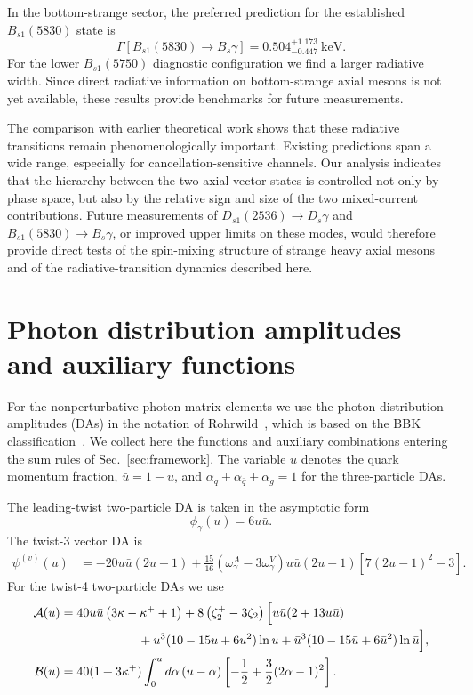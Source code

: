 \documentclass[aps,prd,preprint,nofootinbib,superscriptaddress]{revtex4-2}
\newcommand{\Ds}{D_s}
\newcommand{\Dsone}{D_{s1}}
\newcommand{\Bs}{B_s}
\newcommand{\Bsone}{B_{s1}}
\newcommand{\keV}{\mathrm{keV}}
\begin{document}
In the bottom-strange sector, the preferred prediction for the established
$\Bsone(5830)$ state is
\begin{equation}
  \Gamma[\Bsone(5830)\to\Bs\gamma]
  =
  0.504^{+1.173}_{-0.447}~\keV .
\end{equation}
For the lower \(\Bsone(5750)\) diagnostic configuration we find a larger
radiative width.  Since direct radiative information on bottom-strange axial
mesons is not yet available, these results provide benchmarks for future
measurements.

The comparison with earlier theoretical work shows that these radiative
transitions remain phenomenologically important.  Existing predictions span a
wide range, especially for cancellation-sensitive channels.  Our analysis
indicates that the hierarchy between the two axial-vector states is controlled
not only by phase space, but also by the relative sign and size of the two
mixed-current contributions.  Future measurements of
$\Dsone(2536)\to\Ds\gamma$ and $\Bsone(5830)\to\Bs\gamma$, or improved upper
limits on these modes, would therefore provide direct tests of the spin-mixing
structure of strange heavy axial mesons and of the radiative-transition
dynamics described here.


\appendix

\section{Photon distribution amplitudes and auxiliary functions}
\label{app:sumrule-expressions}

For the nonperturbative photon matrix elements we use the photon distribution
amplitudes (DAs) in the notation of Rohrwild~\cite{Rohrwild:2007yt}, which is
based on the BBK classification~\cite{Ball:2002ps}.  We collect here the
functions and auxiliary combinations entering the sum rules of
Sec.~\ref{sec:framework}.  The variable $u$ denotes the quark momentum
fraction, $\bar u=1-u$, and
$\alpha_q+\alpha_{\bar q}+\alpha_g=1$ for the three-particle DAs.

The leading-twist two-particle DA is taken in the asymptotic form
\begin{equation}
  \phi_\gamma(u)=6u\bar u .
  \label{eq:app-phi}
\end{equation}
The twist-3 vector DA is
\begin{align}
  \psi^{(v)}(u)
  &=
  -20u\bar u(2u-1)
  +\frac{15}{16}\left(\omega_\gamma^A-3\omega_\gamma^V\right)
  u\bar u(2u-1)\left[7(2u-1)^2-3\right].
  \label{eq:app-psiv}
\end{align}
For the twist-4 two-particle DAs we use
\begin{align}
  {\cal A}(u)
  &=
  40u\bar u\left(3\kappa-\kappa^+ +1\right)
  +8\left(\zeta_2^+-3\zeta_2\right)
  \Big[
  u\bar u(2+13u\bar u)
  \notag\\
  &\hspace{2.2cm}
  +u^3(10-15u+6u^2)\ln u
  +\bar u^3(10-15\bar u+6\bar u^2)\ln\bar u
  \Big],
  \label{eq:app-A}\\
  {\cal B}(u)
  &=
  40(1+3\kappa^+)
  \int_0^u d\alpha\,(u-\alpha)
  \left[-\frac12+\frac32(2\alpha-1)^2\right].
  \label{eq:app-B}
\end{align}
\end{document}
